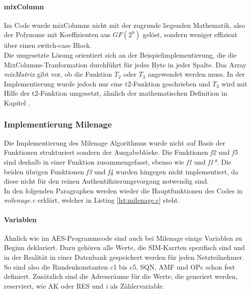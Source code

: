 		\paragraph{mixColumn}
		Im Code wurde mixColumns nicht mit der zugrunde liegenden Mathematik, also der
		Polynome mit Koeffizienten aus $GF(2^8)$ gelöst, sondern weniger effizient über
		einen switch-case Block. \\
		Die umgesetzte Lösung orientiert sich an der Beispielimplementierung, die die MixColumns-Tranformation
		durchführt für jedes Byte in jeder Spalte. Das Array \emph{mixMatrix} gibt vor,
		ob die Funktion $T_2$ oder $T_3$ angewendet werden muss. In der Implementierung
		wurde jedoch nur eine t2-Funktion geschrieben und $T_3$ wird mit Hilfe der 
		t2-Funktion umgesetzt, ähnlich der mathematischen Definition in Kapitel
		.

	\subsubsection[Implementierung Milenage (Heumann)]{Implementierung Milenage}
	\label{implementierung-milenage}
	Die Implementierung des Milenage Algorithmus wurde nicht auf Basis der Funktionen
	strukturiert sondern der Ausgabeblöcke. Die Funktionen \emph{f2} und \emph{f5} sind
	deshalb in einer Funktion zusammengefasst, ebenso wie \emph{f1} und \emph{f1*}. Die
	beiden übrigen Funktionen \emph{f3} und \emph{f4} wurden hingegen nicht implementiert,
	da diese nicht für den reinen Authentifizierungsvorgang notwendig sind. \\
	In den folgenden Paragraphen werden wieder die Hauptfunktionen des Codes in \emph{milenage.c}
	erklärt, welcher in Listing \ref{lst:milenage.c} steht.
	
		\paragraph{Variablen}
		Ähnlich wie im AES-Programmcode sind auch bei Milenage einige Variablen zu Beginn
		deklariert. Dazu gehören alle Werte, die SIM-Karrten spezifisch sind und in der
		Realität in einer Datenbank gespeichert werden für jeden Netzteilnehmer. So sind also
		die Rundenkonstanten c1 bis c5, SQN, AMF und OPc schon fest definiert. Zusätzlich sind
		die Adressräume für die Werte, die generiert werden, reserviert, wie AK oder RES und \emph{i}
		als Zählervariable.
		
